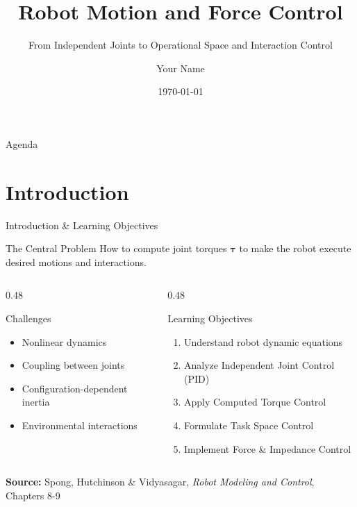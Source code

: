 \documentclass[10pt]{beamer}
\title{Robot Motion and Force Control}
\subtitle{From Independent Joints to Operational Space and Interaction Control}
\author{Your Name}
\institute{Your Institution}
\date{\today}
\newcommand{\vect}[1]{\boldsymbol{#1}}
\newcommand{\tauvec}{\vect{\tau}}
\begin{document}
\begin{frame}
\titlepage
\end{frame}

\begin{frame}{Agenda}
\tableofcontents
\end{frame}

\section{Introduction}
\begin{frame}{Introduction \& Learning Objectives}
    \begin{block}{The Central Problem}
        How to compute joint torques $\tauvec$ to make the robot execute desired motions and interactions.
    \end{block}
    
    \begin{columns}
        \begin{column}{0.48\textwidth}
            \begin{alertblock}{Challenges}
                \begin{itemize}
                    \item Nonlinear dynamics
                    \item Coupling between joints
                    \item Configuration-dependent inertia
                    \item Environmental interactions
                \end{itemize}
            \end{alertblock}
        \end{column}
        \begin{column}{0.48\textwidth}
            \begin{exampleblock}{Learning Objectives}
                \begin{enumerate}
                    \item Understand robot dynamic equations
                    \item Analyze Independent Joint Control (PID)
                    \item Apply Computed Torque Control
                    \item Formulate Task Space Control
                    \item Implement Force \& Impedance Control
                \end{enumerate}
            \end{exampleblock}
        \end{column}
    \end{columns}
    
    \vspace{5mm}
    \footnotesize{\textbf{Source:} Spong, Hutchinson \& Vidyasagar, \emph{Robot Modeling and Control}, Chapters 8-9}
\end{frame}
\end{document}

